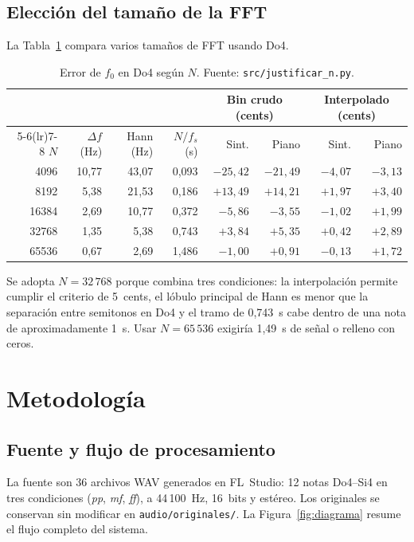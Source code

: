 \documentclass[12pt]{article}
\begin{document}
\subsection{Elección del tamaño de la FFT}
\label{sec:n}
La Tabla~\ref{tab:n} compara varios tamaños de FFT usando Do4.

\begin{table}[ht]
  \centering
  \footnotesize
  \begin{tabular}{rrrrrrrr}
    \toprule
    \rowcolor{TableHead}
    & & & & \multicolumn{2}{c}{Bin crudo (cents)} & \multicolumn{2}{c}{Interpolado (cents)} \\
    \cmidrule(lr){5-6}\cmidrule(lr){7-8}
    \rowcolor{TableHead}
    $N$ & $\Delta f$ (Hz) & Hann (Hz) & $N/f_s$ (s) & Sint. & Piano & Sint. & Piano \\
    \midrule
    4096   & 10,77 & 43,07 & 0,093 & $-25{,}42$ & $-21{,}49$ & $-4{,}07$ & $-3{,}13$ \\
    8192   &  5,38 & 21,53 & 0,186 & $+13{,}49$ & $+14{,}21$ & $+1{,}97$ & $+3{,}40$ \\
    16384  &  2,69 & 10,77 & 0,372 & $-5{,}86$  & $-3{,}55$  & $-1{,}02$ & $+1{,}99$ \\
    \rowcolor{TableGreen}
    32768  &  1,35 &  5,38 & 0,743 & $+3{,}84$  & $+5{,}35$  & $+0{,}42$ & $+2{,}89$ \\
    65536  &  0,67 &  2,69 & 1,486 & $-1{,}00$  & $+0{,}91$  & $-0{,}13$ & $+1{,}72$ \\
    \bottomrule
  \end{tabular}
  \caption{Error de $f_0$ en Do4 según $N$. Fuente:
  \texttt{src/justificar\_n.py}.}
  \label{tab:n}
\end{table}

Se adopta $N=32\,768$ porque combina tres condiciones: la interpolación permite cumplir
el criterio de 5~cents, el lóbulo principal de Hann es menor que la separación entre
semitonos en Do4 y el tramo de 0,743~s cabe dentro de una nota de aproximadamente 1~s.
Usar $N=65\,536$ exigiría 1,49~s de señal o relleno con ceros.

\section{Metodología}
\label{sec:metodologia}

\subsection{Fuente y flujo de procesamiento}
La fuente son 36 archivos WAV generados en FL~Studio: 12 notas Do4--Si4 en tres
condiciones (\emph{pp}, \emph{mf}, \emph{ff}), a 44\,100~Hz, 16~bits y estéreo.
Los originales se conservan sin modificar en \texttt{audio/originales/}. La
Figura~\ref{fig:diagrama} resume el flujo completo del sistema.
\end{document}
